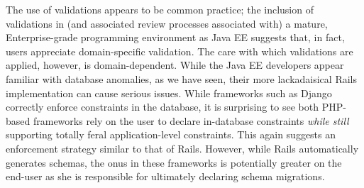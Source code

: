 The use of validations appears to be common
practice; the inclusion of validations in (and associated review
processes associated with) a mature, Enterprise-grade programming
environment as Java EE suggests that, in fact, users appreciate
domain-specific validation. The care with which validations are
applied, however, is domain-dependent. While the Java EE developers
appear familiar with database anomalies, as we have seen, their more
lackadaisical Rails implementation can cause serious issues. While
frameworks such as Django correctly enforce constraints in the
database, it is surprising to see both PHP-based
frameworks rely on the user to declare in-database constraints
\textit{while still} supporting totally feral application-level
constraints. This again suggests an enforcement strategy similar to
that of Rails. However, while Rails automatically generates schemas,
the onus in these frameworks is potentially greater on the end-user as
she is responsible for ultimately declaring schema migrations.


